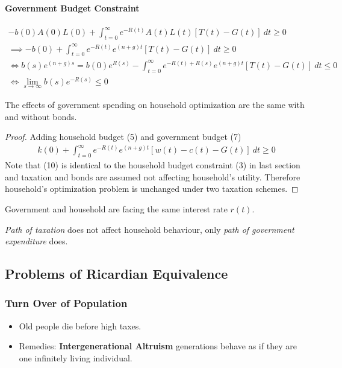 \documentclass[]{article}
\begin{document}
			\paragraph{Government Budget Constraint}
				\begin{gather}
					-b(0) A(0) L(0) + \int_{t=0}^\infty e^{-R(t)} A(t)L(t) [T(t) - G(t)]\ dt \geq 0 \\
					\implies -b(0) + \int_{t=0}^{\infty} e^{-R(t)} e^{(n+g)t} [T(t) - G(t)]\ dt \geq 0 \\
					\iff b(s)e^{(n+g)s} = b(0)e^{R(s)} - \int_{t=0}^{\infty} e^{-R(t)+R(s)} e^{(n+g)t} [T(t) - G(t)]\ dt \leq 0 \\
					\iff \lim_{s\to \infty} b(s) e^{-R(s)} \leq 0
				\end{gather}
			\begin{proposition}
				The effects of government spending on household optimization are the same with and without bonds.
				\begin{proof}
					Adding household budget (5) and government budget (7)
				\begin{gather}
					k(0) + \int_{t=0}^\infty {e^{-R(t)} e^{(n+g)t} [w(t) - c(t) - G(t)]}\ dt \geq 0
				\end{gather}
				Note that (10) is identical to the household budget constraint (3) in last section and taxation and bonds are assumed not affecting household's utility. Therefore household's optimization problem is unchanged under two taxation schemes.
				\end{proof}
				
				\begin{assumption}
					Government and household are facing the same interest rate $r(t)$.
				\end{assumption}
				
				\begin{definition}
					\emph{Path of taxation} does not affect household behaviour, only \emph{path of government expenditure} does.
				\end{definition}
			\end{proposition}
			
		\subsection{Problems of Ricardian Equivalence}
			\subsubsection{Turn Over of Population}
				\begin{itemize}
					\item Old people die before high taxes.
					\item Remedies: \textbf{Intergenerational Altruism} generations behave as if they are one infinitely living individual.
				\end{itemize}
				
\end{document}
